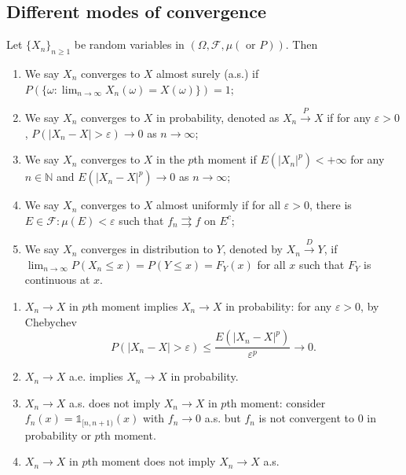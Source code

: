\documentclass[11pt,singlecolumn, openany, citestyle=authoryear]{elegantbook}
\begin{document}
\begin{CJK}{UTF8}{gbsn}
\section{Different modes of convergence}
\begin{definition}
    Let $\{X_n\}_{n\geqslant 1}$ be random variables in $(\Omega,\mathcal{F},\mu(\text{ or }
    P))$. Then 
    \begin{enumerate}
        \item We say $X_n$ converges to $X$ almost surely (a.s.) if $P(\{\omega:\displaystyle
        \lim_{n\to\infty}X_n(\omega)=X(\omega)\})=1$;
        \item We say $X_n$ converges to $X$ in probability, denoted as $X_n\overset{P}{\longrightarrow}
        X$ if for any $\varepsilon>0$, $P(|X_n-X|>\varepsilon)\to 0$ as $n\to\infty$;
        \item We say $X_n$ converges to $X$ in the $p$th moment if $E(|X_n|^p)<+\infty$ for any $n\in\mathbb{N}$
        and $E(|X_n-X|^p)\to 0$ as $n\to\infty$;
        \item We say $X_n$ converges to $X$ almost uniformly if for all
        $\varepsilon>0$, there is $E\in\mathcal{F}:\mu(E)<\varepsilon$ such that 
        $f_n \rightrightarrows f$ on $E^c$;
        \item We say $X_n$ converges in distribution to $Y$, denoted by $X_n \overset{D}{\longrightarrow}Y$,
        if $\displaystyle \lim_{n\to\infty} P(X_n\leqslant x)=P(Y\leqslant x)=F_Y(x)$ for all $x$ such that $F_Y$ is 
        continuous at $x$.
    \end{enumerate}
\end{definition}
\begin{remark}
    \begin{enumerate}
    \item $X_n \to X$ in $p$th moment implies $X_n \to X$ in probability:
    for any $\varepsilon>0$, by Chebychev 
    $$
    P(|X_n-X|>\varepsilon)\leqslant \frac{E(|X_n-X|^p)}{\varepsilon^p} \to 0.
    $$
    \item $X_n\to X$ a.e. implies $X_n\to X$ in probability.
    \item $X_n \to X$ a.s. does not imply $X_n \to X$ in $p$th moment:
    consider $f_n(x)=\mathds{1}_{[n,n+1)}(x)$ with $f_n \to 0$ a.s. but 
    $f_n$ is not convergent to $0$ in probability or $p$th moment.
    \item $X_n \to X$ in $p$th moment does not imply $X_n \to X$ a.s.
    \end{enumerate}
\end{remark}

\end{CJK}
\end{document}
